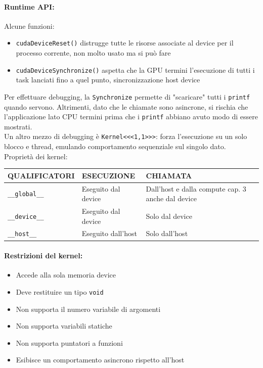 \paragraph{Runtime API:} Alcune funzioni:
\begin{itemize}
	\item \texttt{cudaDeviceReset()} distrugge tutte le risorse associate al device per il processo corrente, non molto usato ma si può fare
	\item \texttt{cudaDeviceSynchronize()} aspetta che la GPU termini l'esecuzione di tutti i task lanciati fino a quel punto, sincronizzazione host device
\end{itemize}
Per effettuare debugging, la \texttt{Synchronize} permette di "scaricare" tutti i \texttt{printf} quando servono. Altrimenti, dato che le chiamate sono asincrone, si rischia che l'applicazione lato CPU termini prima che i \texttt{printf} abbiano avuto modo di essere mostrati. \\

Un altro mezzo di debugging è \texttt{Kernel<<<1,1>>>}: forza l'esecuzione su un solo blocco e thread, emulando comportamento sequenziale sul singolo dato.\\

Proprietà dei kernel: 
\begin{center}
	\begin{tabular}{| l | l | p{4cm} |}
		\hline
		\textbf{QUALIFICATORI} & \textbf{ESECUZIONE} & \textbf{CHIAMATA} \\
		\hline
		\texttt{\_\_global\_\_} & Eseguito dal device & Dall’host e dalla compute cap. 3 anche dal device \\
		\hline
		\texttt{\_\_device\_\_} & Eseguito dal device & Solo dal device \\
		\hline
		\texttt{\_\_host\_\_} & Eseguito dall’host & Solo dall’host \\
		\hline
	\end{tabular}
\end{center}

\paragraph{Restrizioni del kernel: }
\begin{itemize}
	\item Accede alla sola memoria device
	\item Deve restituire un tipo \texttt{void}
	\item Non supporta il numero variabile di argomenti
	\item Non supporta variabili statiche
	\item Non supporta puntatori a funzioni
	\item Esibisce un comportamento asincrono rispetto all'host
\end{itemize}

